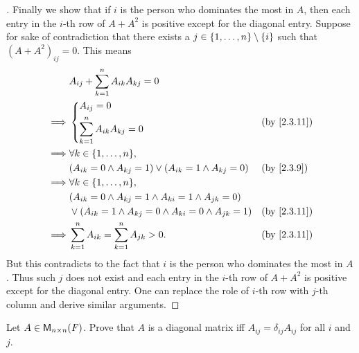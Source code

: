 \begin{proof}[]
	Finally we show that if \(i\) is the person who dominates the most in \(A\), then each entry in the \(i\)-th row of \(A + A^2\) is positive except for the diagonal entry.
	Suppose for sake of contradiction that there exists a \(j \in \left\lbrace1, \dots, n\right\rbrace \setminus \left\lbrace i\right\rbrace\) such that \((A + A^2)_{i j} = 0\).
	This means
	\begin{align*}
		         & A_{i j} + \sum_{k = 1}^n A_{i k} A_{k j} = 0                                              \\
		\implies & \begin{dcases}
			           A_{i j} = 0 \\
			           \sum_{k = 1}^n A_{i k} A_{k j} = 0
		           \end{dcases}                                       &  & \by{2.3.11}                       \\
		\implies & \forall k \in \set{1, \dots, n},                                                          \\
		         & (A_{i k} = 0 \land A_{k j} = 1) \lor (A_{i k} = 1 \land A_{k j} = 0)     &  & \by{2.3.9}  \\
		\implies & \forall k \in \set{1, \dots, n},                                                          \\
		         & (A_{i k} = 0 \land A_{k j} = 1 \land A_{k i} = 1 \land A_{j k} = 0)                       \\
		         & \lor (A_{i k} = 1 \land A_{k j} = 0 \land A_{k i} = 0 \land A_{j k} = 1) &  & \by{2.3.11} \\
		\implies & \sum_{k = 1}^n A_{i k} = \sum_{k = 1}^n A_{j k} > 0.                     &  & \by{2.3.11}
	\end{align*}
	But this contradicts to the fact that \(i\) is the person who dominates the most in \(A\).
	Thus such \(j\) does not exist and each entry in the \(i\)-th row of \(A + A^2\) is positive except for the diagonal entry.
	One can replace the role of \(i\)-th row with \(j\)-th column and derive similar arguments.
\end{proof}

\exercisesection

\setcounter{ex}{9}
\begin{ex}\label{ex:2.3.10}
	Let \(A \in \ms[n][n][\F]\).
	Prove that \(A\) is a diagonal matrix iff \(A_{i j} = \delta_{i j} A_{i j}\) for all \(i\) and \(j\).
\end{ex}

